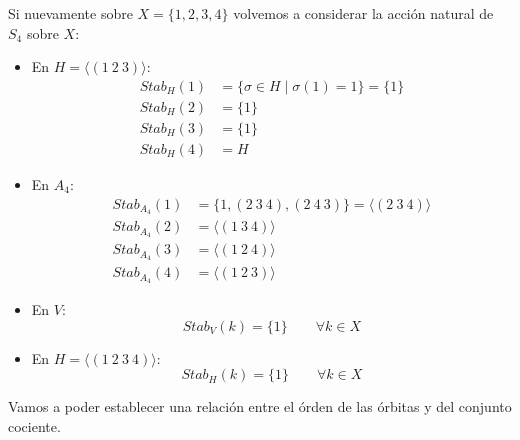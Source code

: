 \begin{ejemplo}
    Si nuevamente sobre $X = \{1,2,3,4\}$ volvemos a considerar la acción natural de $S_4$ sobre $X$:
    \begin{itemize}
        \item En $H = \langle (1\ 2\ 3) \rangle $:
            \begin{align*}
                Stab_H(1) &= \{\sigma\in H \mid \sigma(1) = 1\} = \{1\} \\
                Stab_H(2) &= \{1\} \\
                Stab_H(3) &= \{1\} \\
                Stab_H(4) &= H
            \end{align*}
        \item En $A_4$:
            \begin{align*}
                Stab_{A_4}(1) &= \{1, (2\ 3\ 4), (2\ 4\ 3)\} = \langle (2\ 3\ 4) \rangle  \\
                Stab_{A_4}(2) &= \langle (1\ 3\ 4) \rangle  \\
                Stab_{A_4}(3) &= \langle (1\ 2\ 4) \rangle  \\
                Stab_{A_4}(4) &= \langle (1\ 2\ 3) \rangle  
            \end{align*}
        \item En $V$:
            \begin{equation*}
                Stab_V(k) = \{1\} \qquad \forall k\in X
            \end{equation*}
        \item En $H = \langle (1\ 2\ 3\ 4) \rangle $:
            \begin{equation*}
                Stab_H(k) = \{1\} \qquad \forall k\in X
            \end{equation*}
    \end{itemize}
\end{ejemplo}

\noindent
Vamos a poder establecer una relación entre el órden de las órbitas y del conjunto cociente.

